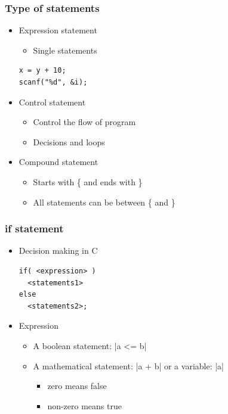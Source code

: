 \documentclass{../c-lecture}
\begin{document}
\begin{frame}[fragile]
  \frametitle{Type of statements}
  \begin{itemize}
    \item Expression statement
    \begin{itemize}
      \item Single statements
    \end{itemize}
    \begin{verbatim}
x = y + 10;
scanf("%d", &i);
    \end{verbatim}
    \item Control statement
    \begin{itemize}
      \item Control the flow of program
      \item Decisions and loops
    \end{itemize}
    \item Compound statement
    \begin{itemize}
      \item Starts with \{ and ends with \}
      \item All statements can be between \{ and \}
    \end{itemize}
  \end{itemize}
\end{frame}

\begin{frame}[fragile]
  \frametitle{if statement}
  \begin{itemize}
    \item Decision making in C
    \begin{verbatim}
if( <expression> )
  <statements1>
else
  <statements2>;
    \end{verbatim}
    \item Expression
    \begin{itemize}
      \item A boolean statement: |a <= b|
      \item
        A mathematical statement: |a + b| or a variable: |a|
      \begin{itemize}
        \item zero means false
        \item non-zero means true
      \end{itemize}
    \end{itemize}
  \end{itemize}
\end{frame}
\end{document}
